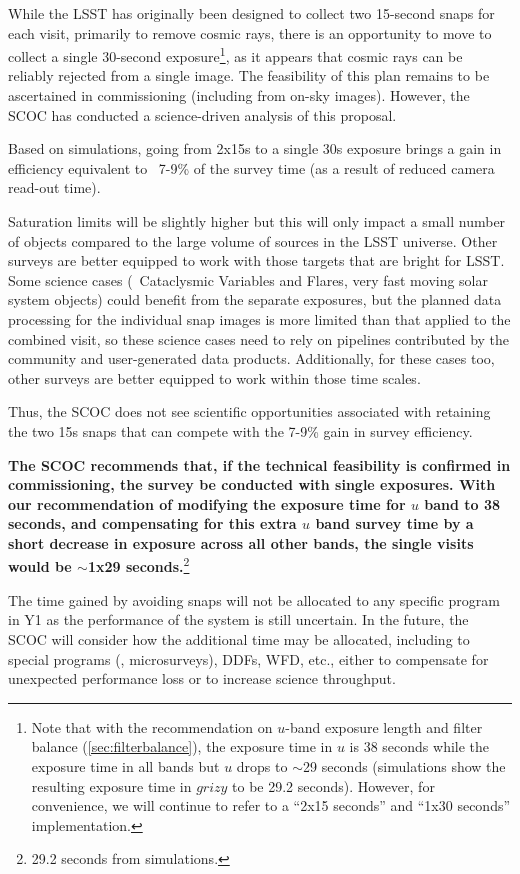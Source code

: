While the LSST has originally been designed to collect two 15-second snaps for each visit, primarily to remove cosmic rays, there is an opportunity to move to collect a single 30-second exposure\footnote{Note that with the recommendation on $u$-band exposure length and filter balance (\autoref{sec:filterbalance}), the exposure time in $u$ is 38 seconds while the exposure time in all bands but $u$ drops to $\sim$29 seconds (simulations show the resulting exposure time in $grizy$ to be 29.2 seconds). However, for convenience, we will continue to refer to a ``2x15 seconds'' and ``1x30 seconds'' implementation.}, as it appears that cosmic rays can be reliably rejected from a single image. The feasibility of this plan remains to be ascertained in commissioning (including from on-sky images). However, the SCOC has conducted a science-driven analysis of this proposal. 

Based on simulations, going from 2x15s to a single 30s exposure brings a gain in efficiency equivalent to ~7-9\% of the survey time (as a result of reduced camera read-out time). 


Saturation limits will be slightly higher but this will only impact a small number of objects compared to the large volume of sources in the LSST universe. Other surveys are better equipped to work with those targets that are bright for LSST.
Some science cases (\eg\ Cataclysmic Variables and Flares, very fast moving solar system objects) could benefit from the separate exposures, but the planned data processing for the individual snap images is more limited than that applied to the combined visit, so these science cases need to rely on pipelines contributed by the community and user-generated data products. Additionally, for these cases too, other surveys are better equipped to work within those time scales.

Thus, the SCOC does not see scientific opportunities associated with retaining the two 15s snaps that can compete with the 7-9\% gain in survey efficiency.

{\bf The SCOC recommends that, if the technical feasibility is confirmed in commissioning, the survey be conducted with single exposures. With our recommendation of modifying the exposure time for $u$ band to 38 seconds, and compensating for this extra $u$ band survey time by a short decrease in exposure across all other bands, the single visits would be $\sim$1x29 seconds.}\footnote{29.2 seconds from simulations.}

The time gained by avoiding snaps will not be allocated to any specific program in Y1 as the performance of the system is still uncertain. In the future, the SCOC will consider how the additional time may be allocated, including to special programs (\eg, microsurveys), DDFs, WFD, etc., either to compensate for unexpected performance loss or to increase science throughput.

